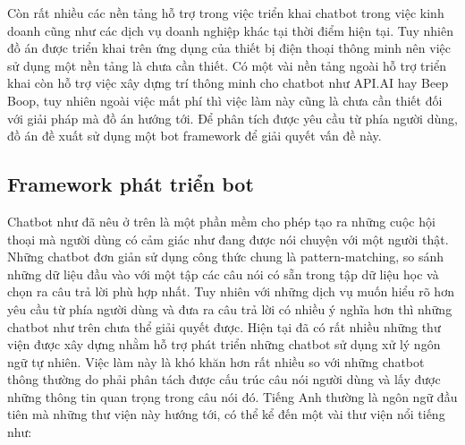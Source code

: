 \documentclass[12pt]{report}
\begin{document}
Còn rất nhiều các nền tảng hỗ trợ trong việc triển khai chatbot trong việc kinh doanh cũng như các dịch vụ doanh nghiệp khác tại thời điểm hiện tại. Tuy nhiên đồ án được triển khai trên ứng dụng của thiết bị điện thoại thông minh nên việc sử dụng một nền tảng là chưa cần thiết. Có một vài nền tảng ngoài hỗ trợ triển khai còn hỗ trợ việc xây dựng trí thông minh cho chatbot như API.AI hay Beep Boop, tuy nhiên ngoài việc mất phí thì việc làm này cũng là chưa cần thiết đối với giải pháp mà đồ án hướng tới. Để phân tích được yêu cầu từ phía người dùng, đồ án đề xuất sử dụng một bot framework để giải quyết vấn đề này.

\subsection{Framework phát triển bot} \label{subsec:frameworkchatbot}

Chatbot như đã nêu ở trên là một phần mềm cho phép tạo ra những cuộc hội thoại mà người dùng có cảm giác như đang được nói chuyện với một người thật. Những chatbot đơn giản sử dụng công thức chung là pattern-matching, so sánh những dữ liệu đầu vào với một tập các câu nói có sẵn trong tập dữ liệu học và chọn ra câu trả lời phù hợp nhất. Tuy nhiên với những dịch vụ muốn hiểu rõ hơn yêu cầu từ phía người dùng và đưa ra câu trả lời có nhiều ý nghĩa hơn thì những chatbot như trên chưa thể giải quyết được. Hiện tại đã có rất nhiều những thư viện được xây dựng nhằm hỗ trợ phát triển những chatbot sử dụng xử lý ngôn ngữ tự nhiên. Việc làm này là khó khăn hơn rất nhiều so với những chatbot thông thường do phải phân tách được cấu trúc câu nói người dùng và lấy được những thông tin quan trọng trong câu nói đó. Tiếng Anh thường là ngôn ngữ đầu tiên mà những thư viện này hướng tới, có thể kể đến một vài thư viện nổi tiếng như:
\end{document}
